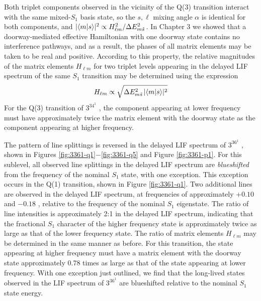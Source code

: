 Both triplet components observed in the vicinity of the Q(3)
transition interact with the same mixed-$S_1$ basis state, so the
$s,\ell$ mixing angle $\alpha$ is identical for both components, and
$\lvert \mathinner{\langle{m|s}\rangle} \rvert^2 \propto H_{\ell m}^2 / \Delta E_{m
  \tilde{s}\,}^2$.  In Chapter 3 we showed that a doorway-mediated effective
Hamiltonian with one doorway state contains no interference pathways,
and as a result, the phases of all matrix elements may be taken to be
real and positive.  According to this property, the relative
magnitudes of the matrix elements $H_{\ell m}$ for two triplet levels
appearing in the delayed LIF spectrum of the same $S_1$ transition may
be determined using the expression
\begin{equation}
  \label{eq:approx-hlm}
  H_{\ell m} \propto \sqrt{ \Delta E_{m \tilde{s}\,}^2 \lvert \mathinner{\langle{m|s}\rangle} \rvert^2 }
\end{equation}
For the Q(3) transition of $3^34^1$ , the component appearing at
lower frequency must have approximately twice the matrix element with
the doorway state as the component appearing at higher frequency.

The pattern of line splittings is reversed in the delayed LIF spectrum
of $3^36^1$ , shown in Figures
\ref{fig:3361-q1}$-$\ref{fig:3361-q5} and Figure \ref{fig:3361-p1}.
For this sublevel, all observed line splittings in the delayed LIF
spectrum are \emph{blueshifted} from the frequency of the nominal
$S_1$ state, with one exception.  This exception occurs in the Q(1)
transition, shown in Figure \ref{fig:3361-q1}.  Two additional lines
are observed in the delayed LIF spectrum, at frequencies of
approximately $+0.10$ and $-0.18$ \rcm, relative to the frequency of
the nominal $S_1$ eigenstate.  The ratio of line intensities is
approximately 2:1 in the delayed LIF spectrum, indicating that the
fractional $S_1$ character of the higher frequency state is
approximately twice as large as that of the lower frequency state.
The ratio of matrix elements $H_{\ell m}$ may be determined in the
same manner as before.  For this transition, the state appearing at
higher frequency must have a matrix element with the doorway state
approximately 0.78 times as large as that of the state appearing at
lower frequency.  With one exception just outlined, we find that the
long-lived states observed in the LIF spectrum of $3^36^1$  are
blueshifted relative to the nominal $S_1$ state energy.

